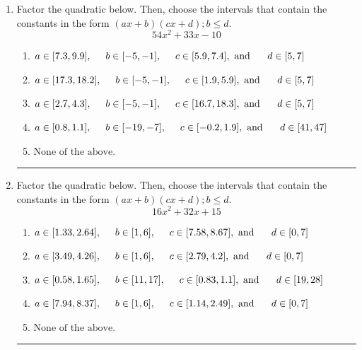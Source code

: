 \documentclass[14pt]{extbook}
\newcommand{\litem}[1]{\item#1\hspace*{-1cm}\rule{\textwidth}{0.4pt}}
\begin{document}
\begin{enumerate}
{\begin{enumerate}[label=\Alph*.]
\end{enumerate} }
\litem{
Factor the quadratic below. Then, choose the intervals that contain the constants in the form $(ax+b)(cx+d); b \leq d.$\[ 54x^{2} +33 x -10 \]\begin{enumerate}[label=\Alph*.]
\item \( a \in [7.3, 9.9], \hspace*{5mm} b \in [-5, -1], \hspace*{5mm} c \in [5.9, 7.4], \text{ and } \hspace*{5mm} d \in [5, 7] \)
\item \( a \in [17.3, 18.2], \hspace*{5mm} b \in [-5, -1], \hspace*{5mm} c \in [1.9, 5.9], \text{ and } \hspace*{5mm} d \in [5, 7] \)
\item \( a \in [2.7, 4.3], \hspace*{5mm} b \in [-5, -1], \hspace*{5mm} c \in [16.7, 18.3], \text{ and } \hspace*{5mm} d \in [5, 7] \)
\item \( a \in [0.8, 1.1], \hspace*{5mm} b \in [-19, -7], \hspace*{5mm} c \in [-0.2, 1.9], \text{ and } \hspace*{5mm} d \in [41, 47] \)
\item \( \text{None of the above.} \)

\end{enumerate} }
\litem{
Factor the quadratic below. Then, choose the intervals that contain the constants in the form $(ax+b)(cx+d); b \leq d.$\[ 16x^{2} +32 x + 15 \]\begin{enumerate}[label=\Alph*.]
\item \( a \in [1.33, 2.64], \hspace*{5mm} b \in [1, 6], \hspace*{5mm} c \in [7.58, 8.67], \text{ and } \hspace*{5mm} d \in [0, 7] \)
\item \( a \in [3.49, 4.26], \hspace*{5mm} b \in [1, 6], \hspace*{5mm} c \in [2.79, 4.2], \text{ and } \hspace*{5mm} d \in [0, 7] \)
\item \( a \in [0.58, 1.65], \hspace*{5mm} b \in [11, 17], \hspace*{5mm} c \in [0.83, 1.1], \text{ and } \hspace*{5mm} d \in [19, 28] \)
\item \( a \in [7.94, 8.37], \hspace*{5mm} b \in [1, 6], \hspace*{5mm} c \in [1.14, 2.49], \text{ and } \hspace*{5mm} d \in [0, 7] \)
\item \( \text{None of the above.} \)


\end{enumerate}}
\end{enumerate}
\end{document}

